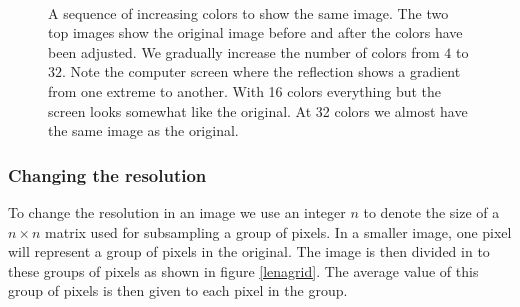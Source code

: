 \documentclass[a4paper, 10pt, final]{article}
\begin{document}
\begin{figure}[!h]
    \\
    \caption[]{A sequence of increasing colors to show the same image.
    The two top images show the original image before and after the
    colors have been adjusted. We gradually increase the number of
    colors from $4$ to $32$. Note the computer screen where the
    reflection shows a gradient from one extreme to another. With 16
    colors everything but the screen looks somewhat like the original.
    At 32 colors we almost have the same image as the original.}
    \label{sequence_colors}
\end{figure}

\subsubsection*{Changing the resolution}
To change the resolution in an image we use an integer $n$ to denote the
size of a $n \times n$ matrix used for subsampling a group of pixels. In
a smaller image, one pixel will represent a group of pixels in the
original. The image is then divided in to these groups of pixels as
shown in figure \ref{lenagrid}. The average value of this group of
pixels is then given to each pixel in the group.
\end{document}
